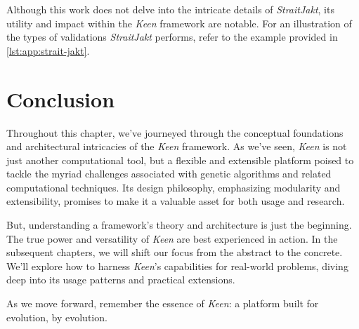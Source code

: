         Although this work does not delve into the intricate details of \textit{StraitJakt}, its utility and impact 
        within the \textit{Keen} framework are notable. For an illustration of the types of validations 
        \textit{StraitJakt} performs, refer to the example provided in \vref{lst:app:strait-jakt}.

    \section{Conclusion}
    \label{sec:keen:conclusion}
        Throughout this chapter, we've journeyed through the conceptual foundations 
        and architectural intricacies of the \textit{Keen} framework. As we've seen, 
        \textit{Keen} is not just another computational tool, but a flexible and 
        extensible platform poised to tackle the myriad challenges associated with 
        genetic algorithms and related computational techniques. Its design 
        philosophy, emphasizing modularity and extensibility, promises to make it a 
        valuable asset for both usage and research.

        But, understanding a framework's theory and architecture is just the 
        beginning. The true power and versatility of \textit{Keen} are best 
        experienced in action. In the subsequent chapters, we will shift our focus 
        from the abstract to the concrete. We'll explore how to harness 
        \textit{Keen}'s capabilities for real-world problems, diving deep into its 
        usage patterns and practical extensions.

        As we move forward, remember the essence of \textit{Keen}: a platform built 
        for evolution, by evolution.